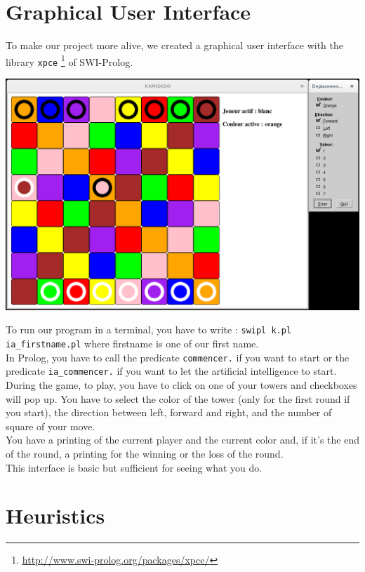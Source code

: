 \documentclass[a4paper, 11pt]{article}
\begin{document}
\section{Graphical User Interface}
To make our project more alive, we created a graphical user interface with the library \verb?xpce? \footnote{\url{http://www.swi-prolog.org/packages/xpce/}} of SWI-Prolog.\\
\begin{center}
\includegraphics[scale = 0.25]{kamisado.png}
\end{center}
To run our program in a terminal, you have to write : \verb?swipl k.pl ia_firstname.pl? where firstname is one of our first name.\\
In Prolog, you have to call the predicate \verb?commencer.? if you want to start or the predicate \verb?ia_commencer.? if you want to let the artificial intelligence to start.\\
During the game, to play, you have to click on one of your towers and checkboxes will pop up. You have to select the color of the tower (only for the first round if you start), the direction  between left, forward and right, and the number of square of your move.\\
You have a printing of the current player and the current color and, if it's the end of the round, a printing for the winning or the loss of the round.\\
This interface is basic but sufficient for seeing what you do.

\section{Heuristics}
\end{document}
